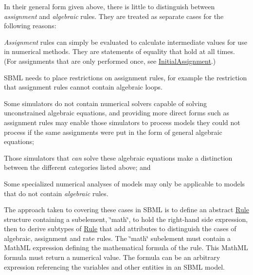 In their general form given above, there is little to distinguish between {\itshape assignment} and {\itshape algebraic} rules. They are treated as separate cases for the following reasons\+:

\begin{DoxyItemize}
\item {\itshape Assignment} rules can simply be evaluated to calculate intermediate values for use in numerical methods. They are statements of equality that hold at all times. (For assignments that are only performed once, see \hyperlink{class_initial_assignment}{Initial\+Assignment}.)\end{DoxyItemize}
\begin{DoxyItemize}
\item S\+B\+ML needs to place restrictions on assignment rules, for example the restriction that assignment rules cannot contain algebraic loops.\end{DoxyItemize}
\begin{DoxyItemize}
\item Some simulators do not contain numerical solvers capable of solving unconstrained algebraic equations, and providing more direct forms such as assignment rules may enable those simulators to process models they could not process if the same assignments were put in the form of general algebraic equations;\end{DoxyItemize}
\begin{DoxyItemize}
\item Those simulators that {\itshape can} solve these algebraic equations make a distinction between the different categories listed above; and\end{DoxyItemize}
\begin{DoxyItemize}
\item Some specialized numerical analyses of models may only be applicable to models that do not contain {\itshape algebraic} rules.\end{DoxyItemize}
The approach taken to covering these cases in S\+B\+ML is to define an abstract \hyperlink{class_rule}{Rule} structure containing a subelement, \char`\"{}math\char`\"{}, to hold the right-\/hand side expression, then to derive subtypes of \hyperlink{class_rule}{Rule} that add attributes to distinguish the cases of algebraic, assignment and rate rules. The \char`\"{}math\char`\"{} subelement must contain a Math\+ML expression defining the mathematical formula of the rule. This Math\+ML formula must return a numerical value. The formula can be an arbitrary expression referencing the variables and other entities in an S\+B\+ML model.

